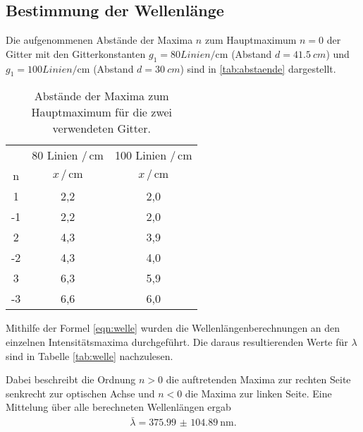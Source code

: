 \subsection{Bestimmung der Wellenlänge} \label{sec:lambda}
Die aufgenommenen Abstände der Maxima $n$ zum Hauptmaximum $n = 0$ der Gitter mit den Gitterkonstanten $g_1 = 80 Linien/\mathrm{cm}$ (Abstand $d = \qty{41,5}{cm}$) und
$g_1 = 100 Linien/\mathrm{cm}$ (Abstand $d = \qty{30}{cm}$) sind in \autoref{tab:abstaende} dargestellt.
\begin{table}
    \centering
    \caption{Abstände der Maxima zum Hauptmaximum für die zwei verwendeten Gitter.}
    \label{tab:abstaende}
    \begin{tabular}{c c c}
        \toprule
           &  80 Linien $/ \, \mathrm{cm}$ &  100 Linien $/ \, \mathrm{cm}$ \\
         n &  $x \, / \, \mathrm{cm}$ &  $x \, / \, \mathrm{cm}$ \\
        \midrule
         1 &     2,2 &       2,0 \\
        -1 &     2,2 &       2,0 \\
         2 &     4,3 &       3,9 \\
        -2 &     4,3 &       4,0 \\
         3 &     6,3 &       5,9 \\
        -3 &     6,6 &       6,0 \\
        \bottomrule
    \end{tabular}
\end{table}

Mithilfe der Formel \ref{eqn:welle} wurden die Wellenlängenberechnungen an den
einzelnen Intensitätsmaxima durchgeführt. Die daraus resultierenden Werte für
$\lambda$ sind in Tabelle \ref{tab:welle} nachzulesen.

Dabei beschreibt die Ordnung $n>0$ die auftretenden Maxima zur rechten Seite
senkrecht zur optischen Achse und $n<0$ die Maxima zur linken Seite.
Eine Mittelung über alle berechneten Wellenlängen ergab
\begin{align*}
  \bar{\lambda} = \SI{375.99(10489)}{\nano\meter}.
\end{align*}